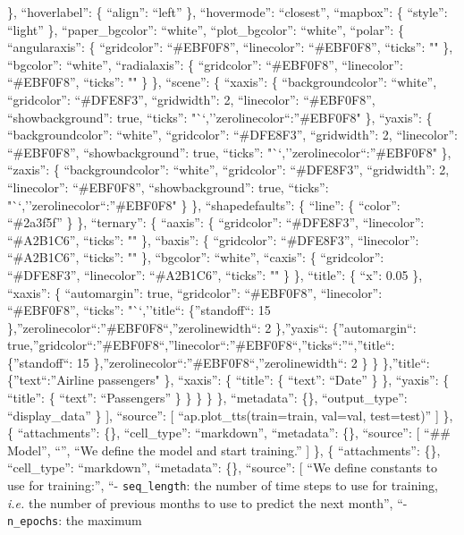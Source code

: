 \documentclass[
]{article}
\begin{document}
\}, ``hoverlabel'': \{ ``align'': ``left'' \}, ``hovermode'':
``closest'', ``mapbox'': \{ ``style'': ``light'' \}, ``paper\_bgcolor'':
``white'', ``plot\_bgcolor'': ``white'', ``polar'': \{ ``angularaxis'':
\{ ``gridcolor'': ``\#EBF0F8'', ``linecolor'': ``\#EBF0F8'', ``ticks'':
"" \}, ``bgcolor'': ``white'', ``radialaxis'': \{ ``gridcolor'':
``\#EBF0F8'', ``linecolor'': ``\#EBF0F8'', ``ticks'': "" \} \},
``scene'': \{ ``xaxis'': \{ ``backgroundcolor'': ``white'',
``gridcolor'': ``\#DFE8F3'', ``gridwidth'': 2, ``linecolor'':
``\#EBF0F8'', ``showbackground'': true, ``ticks'':
"``,''zerolinecolor``:''\#EBF0F8" \}, ``yaxis'': \{ ``backgroundcolor'':
``white'', ``gridcolor'': ``\#DFE8F3'', ``gridwidth'': 2, ``linecolor'':
``\#EBF0F8'', ``showbackground'': true, ``ticks'':
"``,''zerolinecolor``:''\#EBF0F8" \}, ``zaxis'': \{ ``backgroundcolor'':
``white'', ``gridcolor'': ``\#DFE8F3'', ``gridwidth'': 2, ``linecolor'':
``\#EBF0F8'', ``showbackground'': true, ``ticks'':
"``,''zerolinecolor``:''\#EBF0F8" \} \}, ``shapedefaults'': \{ ``line'':
\{ ``color'': ``\#2a3f5f'' \} \}, ``ternary'': \{ ``aaxis'': \{
``gridcolor'': ``\#DFE8F3'', ``linecolor'': ``\#A2B1C6'', ``ticks'': ""
\}, ``baxis'': \{ ``gridcolor'': ``\#DFE8F3'', ``linecolor'':
``\#A2B1C6'', ``ticks'': "" \}, ``bgcolor'': ``white'', ``caxis'': \{
``gridcolor'': ``\#DFE8F3'', ``linecolor'': ``\#A2B1C6'', ``ticks'': ""
\} \}, ``title'': \{ ``x'': 0.05 \}, ``xaxis'': \{ ``automargin'': true,
``gridcolor'': ``\#EBF0F8'', ``linecolor'': ``\#EBF0F8'', ``ticks'':
"``,''title``: \{''standoff``: 15
\},''zerolinecolor``:''\#EBF0F8``,''zerolinewidth``: 2 \},''yaxis``:
\{''automargin``:
true,''gridcolor``:''\#EBF0F8``,''linecolor``:''\#EBF0F8``,''ticks``:''``,''title``:
\{''standoff``: 15 \},''zerolinecolor``:''\#EBF0F8``,''zerolinewidth``:
2 \} \} \},''title``: \{''text``:''Airline passengers" \}, ``xaxis'': \{
``title'': \{ ``text'': ``Date'' \} \}, ``yaxis'': \{ ``title'': \{
``text'': ``Passengers'' \} \} \} \} \}, ``metadata'': \{\},
``output\_type'': ``display\_data'' \} {]}, ``source'': {[}
``ap.plot\_tts(train=train, val=val, test=test)'' {]} \}, \{
``attachments'': \{\}, ``cell\_type'': ``markdown'', ``metadata'': \{\},
``source'': {[} ``\#\# Model\n'', ``\n'', ``We define the model and
start training.'' {]} \}, \{ ``attachments'': \{\}, ``cell\_type'':
``markdown'', ``metadata'': \{\}, ``source'': {[} ``We define constants
to use for training:\n'', ``- \texttt{seq\_length}: the number of time
steps to use for training, \emph{i.e.} the number of previous months to
use to predict the next month\n'', ``- \texttt{n\_epochs}: the maximum
\end{document}
